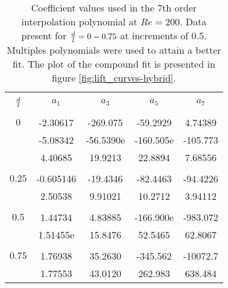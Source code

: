 \begin{table}[ht]

\begin{center}
\setlength{\unitlength}{\textwidth}

\begin{tabular}{c c c c c} %
\hline\hline %
\\[0.2ex]
$\frac{d}{l}$ & $a_1$ & $a_3$ & $a_5$ & $a_7$ \\ [0.8ex] %
\hline 

\\[0.8ex]%
$0$ &  -2.30617 & -269.075 & -59.2929 & 4.74389\\[0.8ex]
    & -5.08342 & -56.5390e & -160.505e & -105.773\\[0.8ex]
    &  4.40685 & 19.9213 & 22.8894 & 7.68556\\[1ex]


\\[0.8ex]%
$0.25$ & -0.605146 & -19.4346 &-82.4463 & -94.4226\\[0.8ex]
      & 2.50538 & 9.91021  & 10.2712 & 3.94112 \\[1ex]

 \\[0.8ex]%


 $0.5$ & 1.44734 & 4.83885  & -166.900e & -983.072 \\[0.8ex]%
  & 1.51455e & 15.8476 & 52.5465 & 62.8067 \\ [1ex] %
  
  \\[0.8ex]%
  
   $0.75$ & 1.76938 & 35.2630 & -345.562 & -10072.7 \\[0.8ex]
          & 1.77553 & 43.0120 & 262.983 & 638.484 \\ [1ex]
          
          
  
  
\hline %


\end{tabular}

\caption{Coefficient values used in the 7th order interpolation polynomial at $Re=200$. Data present for $\frac{d}{l}=0-0.75$ at increments of $0.5$. Multiples polynomials were used to attain a better fit. The plot of the compound fit is presented in figure \ref{fig:lift_curves-hybrid}.} 
 
\label{table:cy-coefficients-hybrid} %
\end{center}
\end{table}

